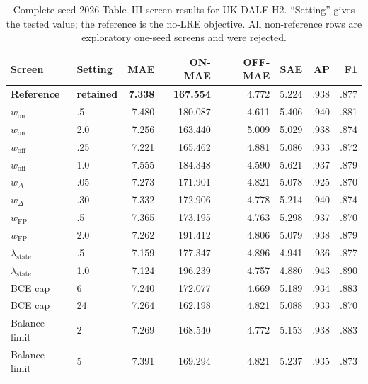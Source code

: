 \documentclass[conference]{IEEEtran}
\newcommand{\selected}[1]{\textbf{#1}}
\begin{document}
\begin{table}[!t]
\caption{Complete seed-2026 Table~III screen results for UK-DALE H2.  ``Setting'' gives the tested value; the reference is the no-LRE objective.  All non-reference rows are exploratory one-seed screens and were rejected.}
\label{tab:appendix-screen-ukdale}
\centering\scriptsize
\begin{tabular}{llrrrrrr}
\toprule
Screen & Setting & MAE & ON-MAE & OFF-MAE & SAE & AP & F1 \\
\midrule
\selected{Reference} & \selected{retained} & \selected{7.338} & \selected{167.554} & 4.772 & 5.224 & .938 & .877 \\
$w_{\mathrm{on}}$ & .5 & 7.480 & 180.087 & 4.611 & 5.406 & .940 & .881 \\
$w_{\mathrm{on}}$ & 2.0 & 7.256 & 163.440 & 5.009 & 5.029 & .938 & .874 \\
$w_{\mathrm{off}}$ & .25 & 7.221 & 165.462 & 4.881 & 5.086 & .933 & .872 \\
$w_{\mathrm{off}}$ & 1.0 & 7.555 & 184.348 & 4.590 & 5.621 & .937 & .879 \\
$w_{\Delta}$ & .05 & 7.273 & 171.901 & 4.821 & 5.078 & .925 & .870 \\
$w_{\Delta}$ & .30 & 7.332 & 172.906 & 4.778 & 5.214 & .940 & .874 \\
$w_{\mathrm{FP}}$ & .5 & 7.365 & 173.195 & 4.763 & 5.298 & .937 & .870 \\
$w_{\mathrm{FP}}$ & 2.0 & 7.262 & 191.412 & 4.806 & 5.079 & .938 & .879 \\
$\lambda_{\mathrm{state}}$ & .5 & 7.159 & 177.347 & 4.896 & 4.941 & .936 & .877 \\
$\lambda_{\mathrm{state}}$ & 1.0 & 7.124 & 196.239 & 4.757 & 4.880 & .943 & .890 \\
BCE cap & 6 & 7.240 & 172.077 & 4.669 & 5.189 & .934 & .883 \\
BCE cap & 24 & 7.264 & 162.198 & 4.821 & 5.088 & .933 & .870 \\
Balance limit & 2 & 7.269 & 168.540 & 4.772 & 5.153 & .938 & .883 \\
Balance limit & 5 & 7.391 & 169.294 & 4.821 & 5.237 & .935 & .873 \\
\bottomrule
\end{tabular}
\end{table}
\end{document}
